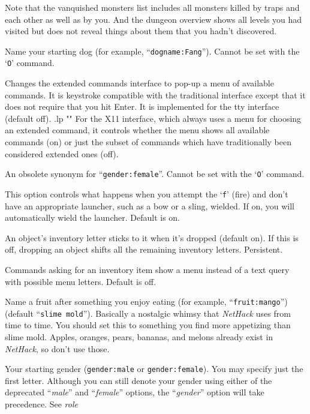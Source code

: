 Note that the vanquished monsters list includes all monsters killed by
traps and each other as well as by you.
And the dungeon overview shows all levels you had visited but does not
reveal things about them that you hadn't discovered.
\item[\ib{dogname}]
Name your starting dog (for example, ``{\tt dogname:Fang}'').
Cannot be set with the `{\tt O}' command.
\item[\ib{extmenu}]
Changes the extended commands interface to pop-up a menu of available commands.
It is keystroke compatible with the traditional interface except that it does
not require that you hit Enter.
It is implemented for the tty interface (default off).
.lp ""
For the X11 interface, which always uses a menu for choosing an extended
command, it controls whether the menu shows all available commands (on)
or just the subset of commands which have traditionally been considered
extended ones (off).
\item[\ib{female}]
An obsolete synonym for ``{\tt gender:female}''.  Cannot be set with the
`{\tt O}' command.
\item[\ib{fireassist}]
This option controls what happens when you attempt the `{\tt f}' (fire)
and don't have an appropriate launcher, such as a bow or a sling, wielded.
If on, you will automatically wield the launcher. Default is on.
\item[\ib{fixinv}]
An object's inventory letter sticks to it when it's dropped (default on).
If this is off, dropping an object shifts all the remaining inventory letters.
Persistent.
\item[\ib{force\_invmenu}]
Commands asking for an inventory item show a menu instead of
a text query with possible menu letters. Default is off.
\item[\ib{fruit}]
Name a fruit after something you enjoy eating (for example, ``{\tt fruit:mango}'')
(default ``{\tt slime mold}''). Basically a nostalgic whimsy that
{\it NetHack\/} uses from time to time.  You should set this to something you
find more appetizing than slime mold.  Apples, oranges, pears, bananas, and
melons already exist in {\it NetHack\/}, so don't use those.
\item[\ib{gender}]
Your starting gender ({\tt gender:male} or {\tt gender:female}).
You may specify just the first letter.
Although you can
still denote your gender using either of the deprecated
``{\it male\/}'' and ``{\it female\/}''
options, the ``{\it gender\/}'' option will take precedence.
See {\it role\/}
